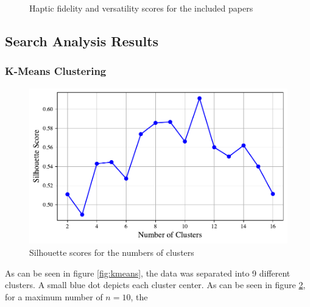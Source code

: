 \begin{figure}[htbp]

\caption{Haptic fidelity and versatility scores for the included papers}
\label{fig:fidelity_plot}
\end{figure}


\subsection{Search Analysis Results}

\subsubsection{K-Means Clustering}

\begin{figure}[htbp]
    \centering
    \includegraphics[width=\columnwidth]{figures/silhouette_11.pdf} 
    \caption{Silhouette scores for the numbers of clusters}
    \label{fig:silhouette}
\end{figure}

As can be seen in figure \ref{fig:kmeans}, the data was separated into 9 different clusters. A small blue dot depicts each cluster center. As can be seen in figure \ref{fig:silhouette}, for a maximum number of $n=10$, the 

